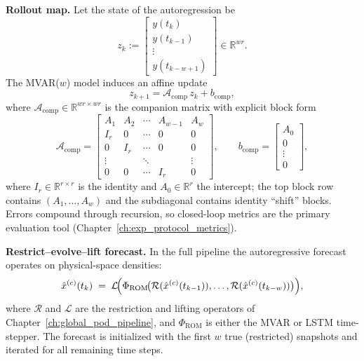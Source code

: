 \noindent\textbf{Rollout map.}
Let the state of the autoregression be
\[
  z_k :=
  \begin{bmatrix}
    y(t_k)\\ y(t_{k-1})\\ \vdots\\ y(t_{k-w+1})
  \end{bmatrix}\in\mathbb{R}^{wr}.
\]
The MVAR($w$) model induces an affine update
\begin{equation}\label{eq:companion_update}
  z_{k+1} = \mathcal{A}_{\mathrm{comp}}\, z_k + b_{\mathrm{comp}},
\end{equation}
where $\mathcal{A}_{\mathrm{comp}}\in\mathbb{R}^{wr\times wr}$ is the
companion matrix with explicit block form
\begin{equation}
  \mathcal{A}_{\mathrm{comp}}
  =
  \begin{bmatrix}
    A_1 & A_2 & \cdots & A_{w-1} & A_w \\
    I_r & 0   & \cdots & 0       & 0   \\
    0   & I_r & \cdots & 0       & 0   \\
    \vdots & & \ddots &         & \vdots \\
    0   & 0   & \cdots & I_r     & 0
  \end{bmatrix},
  \qquad
  b_{\mathrm{comp}}
  =
  \begin{bmatrix} A_0 \\ 0 \\ \vdots \\ 0 \end{bmatrix},
  \label{eq:companion_matrix}
\end{equation}
where $I_r\in\mathbb{R}^{r\times r}$ is the identity and
$A_0\in\mathbb{R}^r$ the intercept; the top block row contains
$(A_1,\dots,A_w)$ and the subdiagonal contains identity ``shift'' blocks.
Errors compound through recursion, so closed-loop metrics are the primary
evaluation tool (Chapter~\ref{ch:exp_protocol_metrics}).

\noindent\textbf{Restrict--evolve--lift forecast.}
In the full pipeline the autoregressive forecast operates on physical-space
densities:
\begin{equation}\label{eq:closed_loop_forecast}
  \hat x^{(c)}(t_k) \;=\;
  \mathcal{L}\!\Bigl(
    \Phi_{\mathrm{ROM}}\!\bigl(
      \mathcal{R}(\hat x^{(c)}(t_{k-1})),\dots,
      \mathcal{R}(\hat x^{(c)}(t_{k-w}))
    \bigr)
  \Bigr),
\end{equation}
where $\mathcal{R}$ and $\mathcal{L}$ are the restriction and lifting
operators of Chapter~\ref{ch:global_pod_pipeline}, and $\Phi_{\mathrm{ROM}}$ is
either the MVAR or LSTM time-stepper.
The forecast is initialized with the first $w$ true (restricted) snapshots
and iterated for all remaining time steps.

